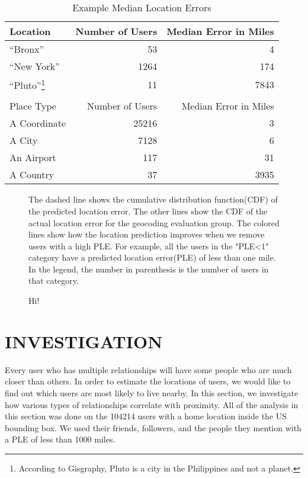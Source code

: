 \documentclass{sig-alternate}
\begin{document}
\begin{table}
\centering
\caption{Example Median Location Errors}
\begin{tabular}{l r r} 
Location&Number of Users&Median Error in Miles\\ \hline
``Bronx''&53&4\\
``New York''&1264&174\\
``Pluto''\footnote{According to Gisgraphy, Pluto is a city in the Philippines and not a planet.}&11&7843\\ \hline
\\
Place Type&Number of Users&Median Error in Miles\\ \hline
A Coordinate&25216&3\\
A City&7128&6\\
An Airport&117&31\\
A Country&37&3935\\
\hline\end{tabular}
\label{tab:MedianLocErr}
\end{table}

\begin{figure}
\centering
{}
\caption{
The dashed line shows the cumulative distribution function(CDF) of the predicted location error.
The other lines show the CDF of the actual location error for the geocoding evaluation group. The colored lines show how the location prediction improves when we remove users with a high PLE. For example, all the users in the "PLE<1" category have a predicted location error(PLE) of less than one mile.
In the legend, the number in parenthesis is the number of users in that category.
}
\label{fig:DiffGnpGps}
\end{figure}


\begin{figure*}
\centering
{}
\caption{
Hi!
}
\label{fig:LocalAll}
\end{figure*}

\section{INVESTIGATION}
Every user who has multiple relationships will have some people who are much
closer than others. In order to estimate the locations of users, we would like
to find out which users are most likely to live nearby.  In this section, we
investigate how various types of relationships correlate with proximity.
All of the analysis in this section was done on the 104214 users with a home location inside the US bounding box. We used their friends, followers, and the people they mention with a PLE of less than 1000 miles.
\end{document}
